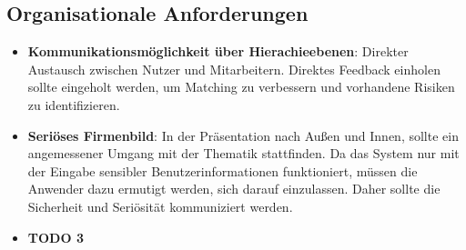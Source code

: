 \subsection{Organisationale Anforderungen}          
\begin{itemize}
   \item
   \textbf{Kommunikationsmöglichkeit über Hierachieebenen}: Direkter Austausch zwischen Nutzer und Mitarbeitern. Direktes Feedback einholen sollte eingeholt werden, um Matching zu verbessern und vorhandene Risiken zu identifizieren.

   \item 
   \textbf{Seriöses Firmenbild}: In der Präsentation nach Außen und Innen, sollte ein angemessener Umgang mit der Thematik stattfinden. Da das System nur mit der Eingabe sensibler Benutzerinformationen funktioniert, müssen die Anwender dazu ermutigt werden, sich darauf einzulassen. Daher sollte die Sicherheit und Seriösität kommuniziert werden.

   \item
   \textbf{TODO 3}

\end{itemize}
